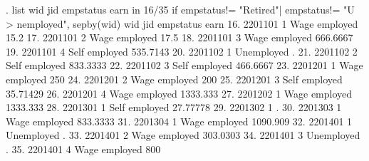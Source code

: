 . list wid jid empstatus earn in 16/35 if empstatus!= "Retired"| empstatus!= "U
> nemployed", sepby(wid)
{\smallskip}
     {\TLC}
     {\VBAR}     wid   jid       empstatus       earn {\VBAR}
     {\LFTT}
 16. {\VBAR} 2201101     1   Wage employed       15.2 {\VBAR}
 17. {\VBAR} 2201101     2   Wage employed       17.5 {\VBAR}
 18. {\VBAR} 2201101     3   Wage employed   666.6667 {\VBAR}
 19. {\VBAR} 2201101     4   Self employed   535.7143 {\VBAR}
     {\LFTT}
 20. {\VBAR} 2201102     1      Unemployed          . {\VBAR}
 21. {\VBAR} 2201102     2   Self employed   833.3333 {\VBAR}
 22. {\VBAR} 2201102     3   Self employed   466.6667 {\VBAR}
     {\LFTT}
 23. {\VBAR} 2201201     1   Wage employed        250 {\VBAR}
 24. {\VBAR} 2201201     2   Wage employed        200 {\VBAR}
 25. {\VBAR} 2201201     3   Self employed   35.71429 {\VBAR}
 26. {\VBAR} 2201201     4   Wage employed   1333.333 {\VBAR}
     {\LFTT}
 27. {\VBAR} 2201202     1   Wage employed   1333.333 {\VBAR}
     {\LFTT}
 28. {\VBAR} 2201301     1   Self employed   27.77778 {\VBAR}
     {\LFTT}
 29. {\VBAR} 2201302     1                          . {\VBAR}
     {\LFTT}
 30. {\VBAR} 2201303     1   Wage employed   833.3333 {\VBAR}
     {\LFTT}
 31. {\VBAR} 2201304     1   Wage employed   1090.909 {\VBAR}
     {\LFTT}
 32. {\VBAR} 2201401     1      Unemployed          . {\VBAR}
 33. {\VBAR} 2201401     2   Wage employed   303.0303 {\VBAR}
 34. {\VBAR} 2201401     3      Unemployed          . {\VBAR}
 35. {\VBAR} 2201401     4   Wage employed        800 {\VBAR}
     {\BLC}
